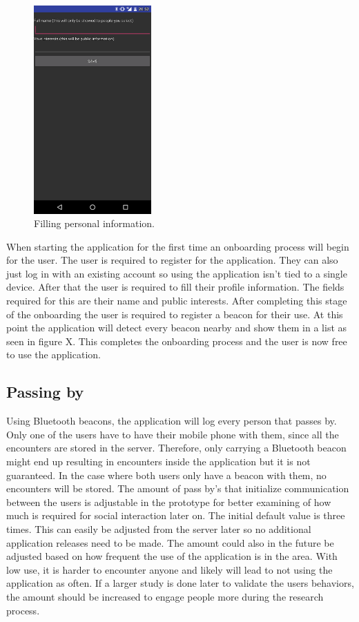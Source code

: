 \begin{figure}[htb]
	\begin{center}
		\includegraphics[width=0.4\textwidth]{fs_onboarding.png}
		\caption{Filling personal information.}
	\end{center}
\end{figure}

When starting the application for the first time an onboarding process will begin for the user. The user is required to register for the application. They can also just log in with an existing account so using the application isn't tied to a single device. After that the user is required to fill their profile information. The fields required for this are their name and public interests. After completing this stage of the onboarding the user is required to register a beacon for their use. At this point the application will detect every beacon nearby and show them in a list as seen in figure X. This completes the onboarding process and the user is now free to use the application.

\subsection{Passing by}

Using Bluetooth beacons, the application will log every person that passes by. Only one of the users have to have their mobile phone with them, since all the encounters are stored in the server. Therefore, only carrying a Bluetooth beacon might end up resulting in encounters inside the application but it is not guaranteed. In the case where both users only have a beacon with them, no encounters will be stored. The amount of pass by's that initialize communication between the users is adjustable in the prototype for better examining of how much is required for social interaction later on. The initial default value is three times. This can easily be adjusted from the server later so no additional application releases need to be made. The amount could also in the future be adjusted based on how frequent the use of the application is in the area. With low use, it is harder to encounter anyone and likely will lead to not using the application as often. If a larger study is done later to validate the users behaviors, the amount should be increased to engage people more during the research process.

